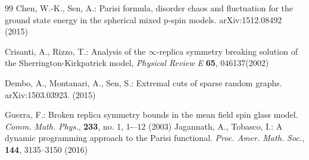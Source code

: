 \documentclass[12pt]{article}
\newenvironment{Proof of lemma}{\noindent{\bf Proof of Lemma}}{\hfill$\Box$\newline}
\newenvironment{Proof of theorem}{\noindent{\bf Proof of Theorem}}{\hfill{\footnotesize${\square}$}\newline}
\newenvironment{Proof of theorems}{\noindent{\bf Proof of Theorems}}{\hfill$\Box$\newline}
\newenvironment{Proof of proposition}{\noindent{\bf Proof of Proposition}}{\hfill$\Box$\newline}
\newenvironment{Proof of propositions}{\noindent{\bf Proof of Propositions}}{\hfill$\Box$\newline}
\newenvironment{Proof of exercise}{\noindent{\it Proof of Exercise:}}{\hfill$\Box$}
\begin{document}
\begin{thebibliography}{99}
%  		
%  		
%  		
  		Chen, W.-K., Sen, A.: Parisi formula, disorder chaos and fluctuation for the ground state energy in the spherical mixed p-spin models. arXiv:1512.08492 (2015)
  		
		
		 Crisanti, A., Rizzo, T.: Analysis of the $\infty$-replica symmetry breaking solution of the Sherrington-Kirkpatrick
model, {\it Physical Review E} {\bf 65}, 046137(2002) 
  		
%  		
%  		
		
		Dembo, A., Montanari, A., Sen, S.: Extremal cuts of sparse random graphs. arXiv:1503.03923. (2015)
		
%  		
  		
  		 Guerra, F.: Broken replica symmetry bounds in the mean field spin glass model. {\it Comm. Math. Phys.}, {\bf 233}, no. 1, 1-–12 (2003)
%  		
%  		
%  		
%  		
		 Jagannath, A., Tobasco, I.: A dynamic programming approach to the Parisi functional. {\it Proc. Amer. Math. Soc.}, {\bf 144},  3135--3150 (2016)
		

\end{thebibliography}
\end{document}
